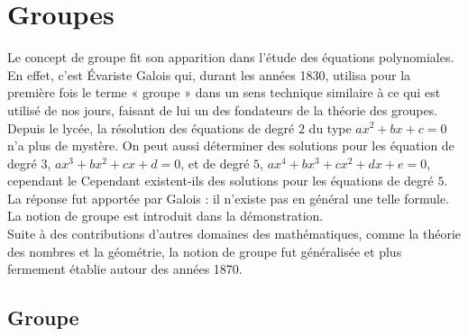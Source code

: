 \documentclass{book}
\begin{document}
\chapter*{Groupes}%



\begin{Texte}%
Le concept de groupe fit son apparition dans l'étude des équations polynomiales. En effet, c'est Évariste Galois qui, durant les années 1830, utilisa pour la première fois le terme « groupe » dans un sens technique similaire à ce qui est utilisé de nos jours, faisant de lui un des fondateurs de la théorie des groupes. \\
Depuis le lycée, la résolution des équations de degré $2$ du type
$ax^2+bx+c=0$ n'a plus de mystère. On peut aussi déterminer des solutions pour les équation de degré $3$, $ax^3+bx^2+cx+d=0$, et de degré $5$, $ax^4+bx^3+cx^2+dx+e=0$, cependant le 
Cependant existent-ils des solutions pour les équations de degré  $5$. La réponse fut apportée par Galois : il n'existe pas en général une telle
 formule. La notion de groupe est introduit dans la démonstration. \\
Suite à des contributions d'autres domaines des mathématiques, comme la théorie des nombres et la géométrie, la notion de groupe fut généralisée et plus fermement établie autour des années 1870.\\
\end{Texte}
\section{Groupe}
\end{document}
